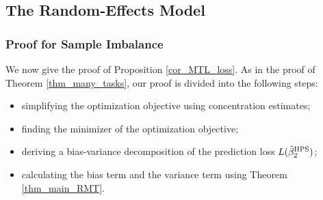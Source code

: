 \subsection{The Random-Effects Model}\label{app_iso_cov}

\subsubsection{Proof for Sample Imbalance}  
We now give the proof of Proposition \ref{cor_MTL_loss}. As in the proof of Theorem \ref{thm_many_tasks}, our proof is divided into the following steps: 
\begin{itemize}
\item simplifying the optimization objective using concentration estimates;

\item finding the minimizer of the optimization objective;

\item deriving a bias-variance decomposition of the prediction loss $L(\hat \beta_2^{\textup{HPS}})$; 

\item calculating the bias term and the variance term using Theorem \ref{thm_main_RMT}. 
\end{itemize}

